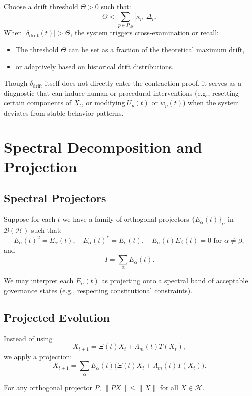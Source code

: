 \documentclass[11pt]{article}
\begin{document}
Choose a drift threshold \(\Theta > 0\) such that:
\[
  \Theta < \sum_{p \in P_{10}} |\kappa_p| \, \Delta_p.
\]
When \(|\delta_{\text{drift}}(t)| > \Theta\), the system triggers cross-examination or recall:

\begin{itemize}
  \item The threshold \(\Theta\) can be set as a fraction of the theoretical maximum drift,
  \item or adaptively based on historical drift distributions.
\end{itemize}

Though \(\delta_{\text{drift}}\) itself does not directly enter the contraction proof, it serves as a diagnostic that can induce human or procedural interventions (e.g., resetting certain components of \(X_t\), or modifying \(U_p(t)\) or \(w_p(t)\)) when the system deviates from stable behavior patterns.

\section{Spectral Decomposition and Projection}

\subsection{Spectral Projectors}

Suppose for each \(t\) we have a family of orthogonal projectors \(\{E_\alpha(t)\}_\alpha\) in \(\mathcal{B}(\mathcal{H})\) such that:
\[
  E_\alpha(t)^2 = E_\alpha(t), \quad E_\alpha(t)^* = E_\alpha(t), \quad E_\alpha(t) E_\beta(t) = 0 \text{ for } \alpha \neq \beta,
\]
and
\[
  I = \sum_\alpha E_\alpha(t).
\]

We may interpret each \(E_\alpha(t)\) as projecting onto a spectral band of acceptable governance states (e.g., respecting constitutional constraints).

\subsection{Projected Evolution}

Instead of using
\[
  X_{t+1} = \Xi(t) X_t + \Lambda_m(t) T(X_t),
\]
we apply a projection:
\[
  X_{t+1} = \sum_\alpha E_\alpha(t)\big(\Xi(t) X_t + \Lambda_m(t) T(X_t)\big).
\]

\begin{lemma}
For any orthogonal projector \(P\), \(\|P X\| \leq \|X\|\) for all \(X \in \mathcal{H}\).
\end{lemma}
\end{document}

